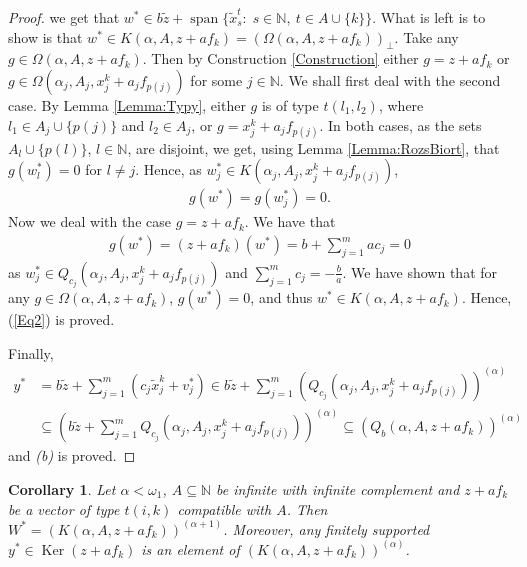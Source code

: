 \documentclass{amsart}
\newtheorem{corollary}[theorem]{Corollary}
\theoremstyle{definition}
\begin{document}
\begin{proof}
    we get that $w^* \in b \widetilde{z} + \operatorname{span} \{\widetilde{x}^t_s: \; s \in \mathbb{N}, \: t \in A \cup \{k\}\}$. What is left is to show is that $w^* \in K(\alpha,A,z + af_k) = \left(\Omega(\alpha,A,z + af_k)\right)_{\perp}$. Take any $g \in \Omega(\alpha,A,z + af_k)$. Then by Construction \ref{Construction} either $g = z + af_k$ or $g \in \Omega(\alpha_j,A_j,x^k_j + a_j f_{p(j)})$ for some $j \in \mathbb{N}$. We shall first deal with the second case. By Lemma \ref{Lemma:Typy}, either $g$ is of type $t(l_1,l_2)$, where $l_1 \in A_j \cup \{p(j)\}$ and $l_2 \in A_j$, or $g = x^k_j + a_j f_{p(j)}$. In both cases, as the sets $A_l \cup \{p(l)\}$, $l \in \mathbb{N}$, are disjoint, we get, using Lemma \ref{Lemma:RozsBiort}, that $g(w_l^*) = 0$ for $l \neq j$. Hence, as $w_j^* \in K(\alpha_j,A_j,x^k_j + a_j f_{p(j)})$,
    \begin{align*}
        g(w^*) = g(w_j^*) = 0.
    \end{align*}
    Now we deal with the case $g = z + af_k$. We have that
    \begin{align*}
        g(w^*) = (z + af_k)(w^*) = b + \sum_{j=1}^m ac_j = 0
    \end{align*}
    as $w_j^* \in Q_{c_j}(\alpha_j,A_j,x^k_j+a_j f_{p(j)})$ and $\sum_{j=1}^m c_j = - \frac{b}{a}$. We have shown that for any $g \in \Omega(\alpha,A,z + af_k)$, $g(w^*) = 0$, and thus $w^* \in K(\alpha,A,z + af_k)$. Hence, (\ref{Eq2}) is proved.
    
    Finally,
    \begin{align*}
        y^* &= b \widetilde{z} + \sum_{j=1}^m \left( c_j \widetilde{x}^k_j + v_j^* \right) \in b \widetilde{z} + \sum_{j=1}^m \left( Q_{c_j}(\alpha_j, A_j, x^k_j +a_j f_{p(j)}) \right)^{(\alpha)} \\
        &\subseteq \left( b \widetilde{z} + \sum_{j=1}^m Q_{c_j}(\alpha_j, A_j, x^k_j +a_j f_{p(j)}) \right)^{(\alpha)} \subseteq \left( Q_b(\alpha,A,z + af_k) \right)^{(\alpha)}
    \end{align*}
    and \textit{(b)} is proved.
\end{proof}

\begin{corollary} \label{Corollary:Dosazeni}
    Let $\alpha < \omega_1$, $A \subseteq \mathbb{N}$ be infinite with infinite complement and $z + a f_k$ be a vector of type $t(i,k)$ compatible with $A$. Then $W^* = \left( K(\alpha,A,z + a f_k) \right)^{(\alpha+1)}$. Moreover, any finitely supported $y^* \in \operatorname{Ker}(z + a f_k)$ is an element of $\left( K(\alpha,A,z + a f_k) \right)^{(\alpha)}$.
\end{corollary}
\end{document}

